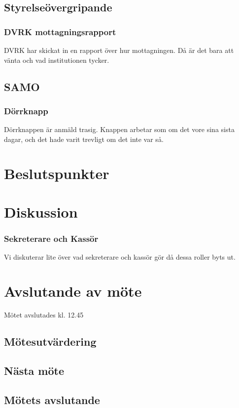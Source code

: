 \documentclass[protokoll]{dvd}
\begin{document}
\subsection{Styrelseövergripande}

\subsubsection*{DVRK mottagningsrapport}
    DVRK har skickat in en rapport över hur mottagningen. Då är det bara att vänta och vad
    institutionen tycker.

\newpage




\subsection{SAMO}
    \subsubsection*{Dörrknapp}
    Dörrknappen är anmäld trasig. Knappen arbetar som om det vore sina sista dagar, och det hade
    varit trevligt om det inte var så.

\section{Beslutspunkter}

\section{Diskussion}

\subsubsection*{Sekreterare och Kassör}
Vi diskuterar lite över vad sekreterare och kassör gör då dessa roller byts ut.

\section{Avslutande av möte}
Mötet avslutades kl. 12.45

\subsection{Mötesutvärdering}

\subsection{Nästa möte}

\subsection{Mötets avslutande}

\styrelsesignaturer
\end{document}
